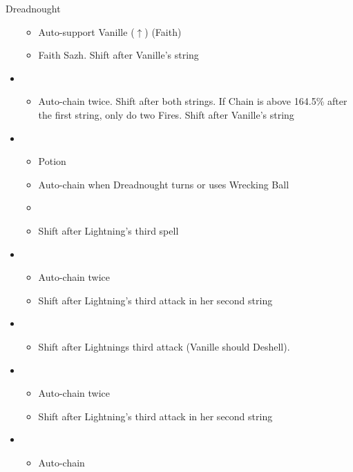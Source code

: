 \begin{battle}{Dreadnought}
\begin{multicols}{2}
\begin{itemize}
\begin{itemize}
        \item Auto-support Vanille ($\uparrow$) (Faith)
        \item Faith Sazh. Shift after Vanille's string
    \end{itemize}
    \item \fifth
    \begin{itemize}
        \item Auto-chain twice. Shift after both strings. If Chain is above 164.5\% after the first string, only do two Fires. Shift after Vanille's string
    \end{itemize}
    \item \fourth
    \begin{itemize}
        \item Potion
        \item Auto-chain when Dreadnought turns or uses Wrecking Ball
        \item \stagger
        \item Shift after Lightning's third spell
    \end{itemize}
    \item \first
    \begin{itemize}
        \item Auto-chain twice
        \item Shift after Lightning's third attack in her second string
    \end{itemize}
    \item \second
    \begin{itemize}
        \item Shift after Lightnings third attack (Vanille should Deshell).
    \end{itemize}
    \item \first
    \begin{itemize}
        \item Auto-chain twice
        \item Shift after Lightning's third attack in her second string
    \end{itemize}
    \item \third
    \begin{itemize}
        \item Auto-chain
    \end{itemize}
\end{itemize}
\end{multicols}
\end{battle}
